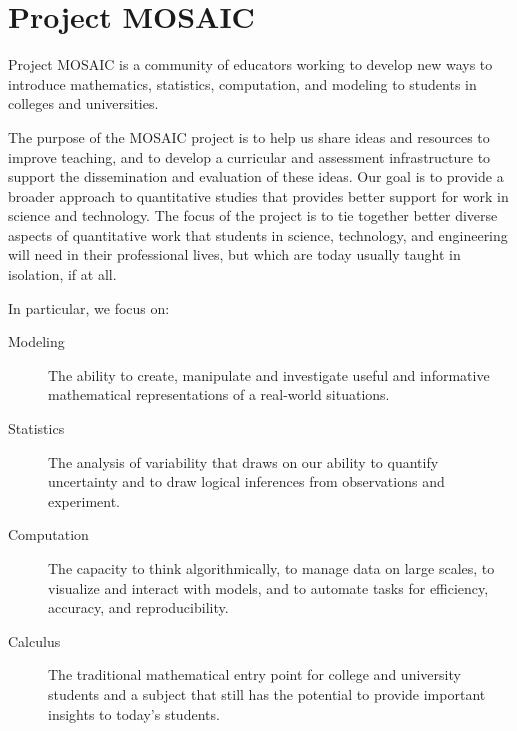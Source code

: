 \chapter*{Project MOSAIC}

Project MOSAIC is a community of educators working to develop  new ways to
introduce mathematics, statistics, computation, and modeling to students in
colleges and universities.

\bigskip

The purpose of the MOSAIC project is to help us share ideas and resources to
improve teaching, and to develop a curricular and assessment
infrastructure to support the dissemination and evaluation of these ideas.
Our goal is to provide a broader approach to quantitative studies that provides
better support for work in science and technology. 
The focus of the project is to tie together
better diverse aspects of quantitative work that students in science,
technology, and engineering will need in their professional lives, but which
are today usually taught in isolation, if at all.  

In particular, we focus on:
\begin{description}
	\item[Modeling] The ability to create, manipulate and investigate useful
	and informative mathematical representations of a real-world situations.

	\item[Statistics] The analysis of variability that draws on our ability to
	quantify uncertainty and to draw logical inferences from observations and
	experiment.

    \item[Computation] 
	The capacity to think algorithmically, to manage data on large scales, to
	visualize and interact with models, and to automate tasks for efficiency,
	accuracy, and reproducibility.

    \item[Calculus] 
	The traditional mathematical entry point for college and university
	students and a subject that still has the potential to provide important
	insights to today's students.
	\end{description}

